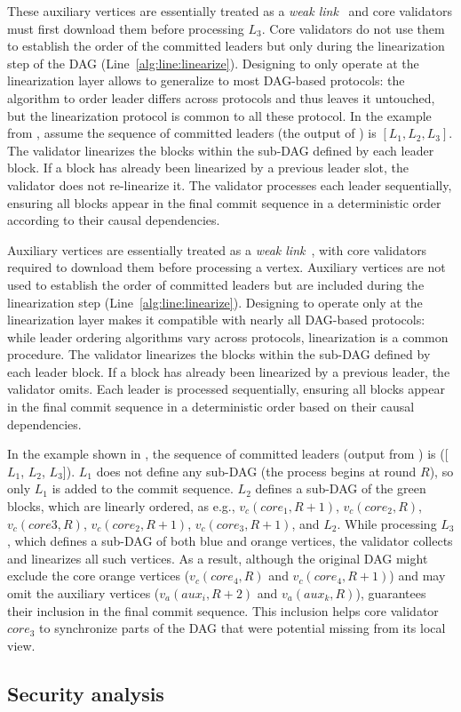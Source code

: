 These auxiliary vertices are essentially treated as a \emph{weak link}~\cite{dag-rider} and core validators must first download them before processing $L_3$. Core validators do not use them to establish the order of the committed leaders but only during the linearization step of the DAG (Line~\ref{alg:line:linearize}). Designing \sysname to only operate at the linearization layer allows \sysname to generalize to most DAG-based protocols: the algorithm to order leader differs across protocols and thus \sysname leaves it untouched, but the linearization protocol is common to all these protocol.
In the example from , assume the sequence of committed leaders (the output of ) is $[L_1, L_2, L_3]$. The validator linearizes the blocks within the sub-DAG defined by each leader block. If a block has already been linearized by a previous leader slot, the validator does not re-linearize it. The validator processes each leader sequentially, ensuring all blocks appear in the final commit sequence in a deterministic order according to their causal dependencies.

Auxiliary vertices are essentially treated as a \emph{weak link}~\cite{dag-rider}, with core validators required to download them before processing a vertex. Auxiliary vertices are not used to establish the order of committed leaders but are included during the linearization step (Line~\ref{alg:line:linearize}). Designing \sysname to operate only at the linearization layer makes it compatible with nearly all DAG-based protocols: while leader ordering algorithms vary across protocols, linearization is a common procedure. The validator linearizes the blocks within the sub-DAG defined by each leader block. If a block has already been linearized by a previous leader, the validator omits. Each leader is processed sequentially, ensuring all blocks appear in the final commit sequence in a deterministic order based on their causal dependencies.

In the example shown in , the sequence of committed leaders (output from ) is ([$L_1$, $L_2$, $L_3$]).
$L_{1}$ does not define any sub-DAG (the process begins at round $R$), so only $L_1$ is added to the commit sequence.
$L_{2}$ defines a sub-DAG of the green blocks, which are linearly ordered, as e.g., $v_c(core_1,R+1)$, $v_c(core_2,R)$, $v_c(core3,R)$, $v_c(core_2,R+1)$, $v_c(core_3,R+1)$, and $L_2$.
While processing $L_3$, which defines a sub-DAG of both blue and orange vertices, the validator collects and linearizes all such vertices. As a result, although the original DAG might exclude the core orange vertices ($v_c(core_4, R)$ and $v_c(core_4, R+1)$) and may omit the auxiliary vertices ($v_a(aux_i,R+2)$ and $v_a(aux_k,R)$), \sysname guarantees their inclusion in the final commit sequence. This inclusion helps core validator $core_3$ to synchronize parts of the DAG that were potential missing from its local view.

\subsection{Security analysis} \label{sec:security}

